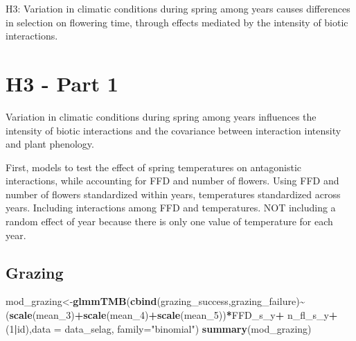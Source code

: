 \documentclass[
]{article}
\newenvironment{Shaded}{\begin{snugshade}}{\end{snugshade}}
\newcommand{\DataTypeTok}[1]{\textcolor[rgb]{0.13,0.29,0.53}{#1}}
\newcommand{\DecValTok}[1]{\textcolor[rgb]{0.00,0.00,0.81}{#1}}
\newcommand{\KeywordTok}[1]{\textcolor[rgb]{0.13,0.29,0.53}{\textbf{#1}}}
\newcommand{\NormalTok}[1]{#1}
\newcommand{\OperatorTok}[1]{\textcolor[rgb]{0.81,0.36,0.00}{\textbf{#1}}}
\newcommand{\StringTok}[1]{\textcolor[rgb]{0.31,0.60,0.02}{#1}}
\begin{document}
H3: Variation in climatic conditions during spring among years causes
differences in selection on flowering time, through effects mediated by
the intensity of biotic interactions.

\hypertarget{h3---part-1}{%
\section{H3 - Part 1}\label{h3---part-1}}

Variation in climatic conditions during spring among years influences
the intensity of biotic interactions and the covariance between
interaction intensity and plant phenology.

First, models to test the effect of spring temperatures on antagonistic
interactions, while accounting for FFD and number of flowers. Using FFD
and number of flowers standardized within years, temperatures
standardized across years. Including interactions among FFD and
temperatures. NOT including a random effect of year because there is
only one value of temperature for each year.

\hypertarget{grazing}{%
\subsection{Grazing}\label{grazing}}

\begin{Shaded}
\begin{Highlighting}[]
\NormalTok{mod\_grazing\textless{}{-}}\KeywordTok{glmmTMB}\NormalTok{(}\KeywordTok{cbind}\NormalTok{(grazing\_success,grazing\_failure)}\OperatorTok{\textasciitilde{}}
\StringTok{                     }\NormalTok{(}\KeywordTok{scale}\NormalTok{(mean\_}\DecValTok{3}\NormalTok{)}\OperatorTok{+}\KeywordTok{scale}\NormalTok{(mean\_}\DecValTok{4}\NormalTok{)}\OperatorTok{+}\KeywordTok{scale}\NormalTok{(mean\_}\DecValTok{5}\NormalTok{))}\OperatorTok{*}\NormalTok{FFD\_s\_y}\OperatorTok{+}
\StringTok{                     }\NormalTok{n\_fl\_s\_y}\OperatorTok{+}\NormalTok{(}\DecValTok{1}\OperatorTok{|}\NormalTok{id),}\DataTypeTok{data =}\NormalTok{ data\_selag,}
                   \DataTypeTok{family=}\StringTok{"binomial"}\NormalTok{)}
\KeywordTok{summary}\NormalTok{(mod\_grazing)}
\end{Highlighting}
\end{Shaded}
\end{document}
